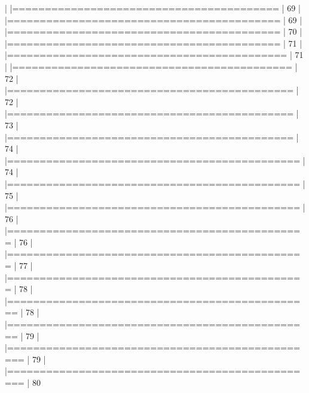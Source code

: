 \documentclass[article,nojss]{jss} %
\begin{document}
\begin{Schunk}
\begin{Soutput}
  |                                                                  
  |=========================================                   |  69%
  |                                                                  
  |==========================================                  |  69%
  |                                                                  
  |==========================================                  |  70%
  |                                                                  
  |==========================================                  |  71%
  |                                                                  
  |===========================================                 |  71%
  |                                                                  
  |===========================================                 |  72%
  |                                                                  
  |============================================                |  72%
  |                                                                  
  |============================================                |  73%
  |                                                                  
  |============================================                |  74%
  |                                                                  
  |=============================================               |  74%
  |                                                                  
  |=============================================               |  75%
  |                                                                  
  |=============================================               |  76%
  |                                                                  
  |==============================================              |  76%
  |                                                                  
  |==============================================              |  77%
  |                                                                  
  |==============================================              |  78%
  |                                                                  
  |===============================================             |  78%
  |                                                                  
  |===============================================             |  79%
  |                                                                  
  |================================================            |  79%
  |                                                                  
  |================================================            |  80%

\end{Soutput}
\end{Schunk}
\end{document}
